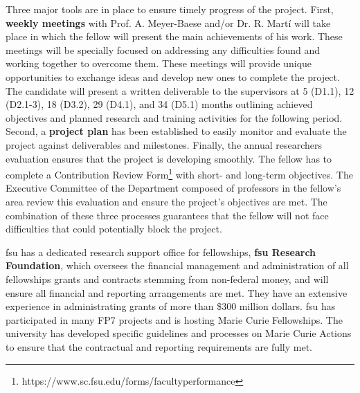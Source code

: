 Three major tools are in place to ensure timely progress of the project.
First, \textbf{weekly meetings} with Prof. A. Meyer-Baese and/or Dr. R. Mart\'i will take place in which the fellow will present the main achievements of his work.
These meetings will be specially focused on addressing any difficulties found and working together to overcome them.
These meetings will provide unique opportunities to exchange ideas and develop new ones to complete the project.
The candidate will present a written deliverable to the supervisors at 5 (D1.1), 12 (D2.1-3), 18 (D3.2), 29 (D4.1), and 34 (D5.1) months outlining achieved objectives and planned research and training activities for the following period.
Second, a \textbf{project plan} has been established to easily monitor and evaluate the project against deliverables and milestones.
Finally, the annual researchers evaluation ensures that the project is developing smoothly.
The fellow has to complete a Contribution Review Form\footnote{https://www.sc.fsu.edu/forms/facultyperformance} with short- and long-term objectives.
The Executive Committee of the Department composed of professors in the fellow's area review this evaluation and ensure the project's objectives are met.
The combination of these three processes guarantees that the fellow will not face difficulties that could potentially block the project.

\ac{fsu} has a dedicated research support office for fellowships, \textbf{\ac{fsu} Research Foundation}, which oversees the financial management and administration of all fellowships grants and contracts stemming from non-federal money, and will ensure all financial and reporting arrangements are met.
They have an extensive experience in administrating grants of more than \$300 million dollars.
\ac{fsu} has participated in many FP7 projects and is hosting Marie Curie Fellowships.
The university has developed specific guidelines and processes on Marie Curie Actions to ensure that the contractual and reporting requirements are fully met.

